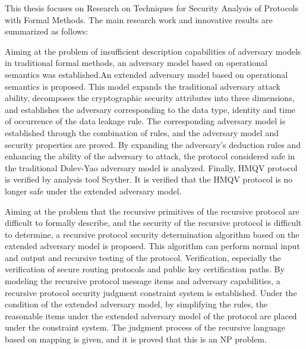 \begin{eabstract}
This thesis focuses on Research on Techniques for Security Analysis of  Protocols with Formal Methods. The main research work and innovative results are summarized as follows:


Aiming at the problem of insufficient description capabilities of adversary models in traditional formal methods, an adversary model based on operational semantics was established.An extended adversary model based on operational semantics is proposed. This model expands the traditional adversary attack ability, decomposes the cryptographic security attributes into three dimensions, and establishes the adversary corresponding to the data type, identity and time of occurrence of the data leakage rule. The corresponding adversary model is established through the combination of rules, and the adversary model and security properties are proved. By expanding the adversary's deduction rules and enhancing the ability of the adversary to attack, the protocol considered safe in the traditional Dolev-Yao adversary model is analyzed. Finally, HMQV protocol is verified by analysis tool Scyther. It is verified that the HMQV protocol is no longer safe under the extended adversary model.

Aiming at the problem that the recursive primitives of the recursive protocol are difficult to formally describe, and the security of the recursive protocol is difficult to determine, a recursive protocol security determination algorithm based on the extended adversary model is proposed. This algorithm can perform normal input and output and recursive testing of the protocol. Verification, especially the verification of secure routing protocols and public key certification paths. By modeling the recursive protocol message items and adversary capabilities, a recursive protocol security judgment constraint system is established. Under the condition of the extended adversary model, by simplifying the rules, the reasonable items under the extended adversary model of the protocol are placed under the constraint system. The judgment process of the recursive language based on mapping is given, and it is proved that this is an NP problem.


\end{eabstract}
